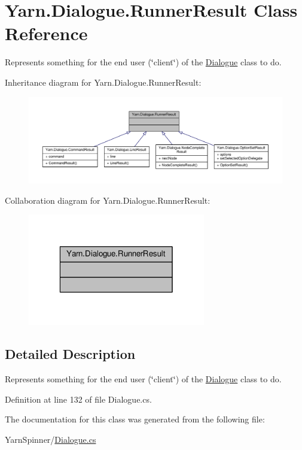 \hypertarget{a00150}{\section{Yarn.\-Dialogue.\-Runner\-Result Class Reference}
\label{a00150}
}


Represents something for the end user (\char`\"{}client\char`\"{}) of the \hyperlink{a00086}{Dialogue} class to do.  




Inheritance diagram for Yarn.\-Dialogue.\-Runner\-Result\-:
\nopagebreak
\begin{figure}[H]
\begin{center}
\leavevmode
\includegraphics[width=350pt]{a00619}
\end{center}
\end{figure}


Collaboration diagram for Yarn.\-Dialogue.\-Runner\-Result\-:
\nopagebreak
\begin{figure}[H]
\begin{center}
\leavevmode
\includegraphics[width=220pt]{a00620}
\end{center}
\end{figure}


\subsection{Detailed Description}
Represents something for the end user (\char`\"{}client\char`\"{}) of the \hyperlink{a00086}{Dialogue} class to do. 

Definition at line 132 of file Dialogue.\-cs.



The documentation for this class was generated from the following file\-:\begin{DoxyCompactItemize}
\item 
Yarn\-Spinner/\hyperlink{a00296}{Dialogue.\-cs}\end{DoxyCompactItemize}
